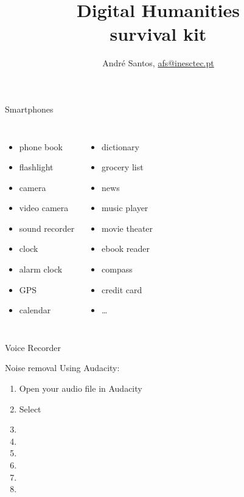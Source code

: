 \documentclass[serif,14pt,color=usenames,dvipsnames]{beamer}
\title{{\Large Digital Humanities}\\survival kit}
\author{André Santos, \href{mailto:afs@inesctec.pt}{afs@inesctec.pt}}
\begin{document}
\begin{frame}
\maketitle
\end{frame}






\begin{frame}{Smartphones}
  \begin{columns}
    \begin{itemize}
      \item phone book
      \item flashlight
      \item camera
      \item video camera
      \item sound recorder
      \item clock
      \item alarm clock
      \item GPS
      \item calendar
    \end{itemize}
    \begin{itemize}
      \item dictionary
      \item grocery list
      \item news
      \item music player
      \item movie theater
      \item ebook reader
      \item compass
      \item credit card
      \item \dots
    \end{itemize}
  \end{columns}
\end{frame}

\begin{frame}{Voice Recorder}

\end{frame}

\begin{frame}{Noise removal}
  Using Audacity:
  \begin{enumerate}
    \item Open your audio file in Audacity
    \item Select 
    \item 
    \item 
    \item 
    \item 
    \item 
    \item 
  \end{enumerate}
\end{frame}
\end{document}
